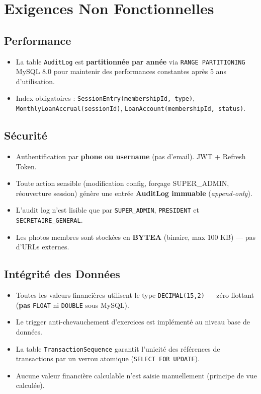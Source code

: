 \documentclass[12pt, a4paper]{report}
\begin{document}
\chapter{Exigences Non Fonctionnelles}

\section{Performance}

\begin{itemize}
  \item La table \texttt{AuditLog} est \textbf{partitionnée par année} via \texttt{RANGE PARTITIONING}
        MySQL 8.0 pour maintenir des performances constantes après 5 ans d'utilisation.
  \item Index obligatoires :
        \texttt{SessionEntry(membershipId, type)},
        \texttt{MonthlyLoanAccrual(sessionId)},
        \texttt{LoanAccount(membershipId, status)}.
\end{itemize}

\section{Sécurité}

\begin{itemize}
  \item Authentification par \textbf{phone ou username} (pas d'email). JWT + Refresh Token.
  \item Toute action sensible (modification config, forçage SUPER\_ADMIN, réouverture session)
        génère une entrée \textbf{AuditLog immuable} (\textit{append-only}).
  \item L'audit log n'est lisible que par \texttt{SUPER\_ADMIN}, \texttt{PRESIDENT} et \texttt{SECRETAIRE\_GENERAL}.
  \item Les photos membres sont stockées en \textbf{BYTEA} (binaire, max 100 KB) — pas d'URLs externes.
\end{itemize}

\section{Intégrité des Données}

\begin{itemize}
  \item Toutes les valeurs financières utilisent le type \texttt{DECIMAL(15,2)} — zéro flottant
        (\textbf{pas} \texttt{FLOAT} ni \texttt{DOUBLE} sous MySQL).
  \item Le trigger anti-chevauchement d'exercices est implémenté au niveau base de données.
  \item La table \texttt{TransactionSequence} garantit l'unicité des références de transactions
        par un verrou atomique (\texttt{SELECT FOR UPDATE}).
  \item Aucune valeur financière calculable n'est saisie manuellement (principe de vue calculée).
\end{itemize}
\end{document}
